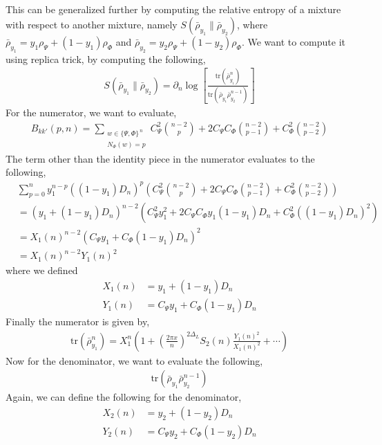 \documentclass[11pt]{article}
\newcommand{\p}{\partial}
\newcommand{\lb}{\left(}
\newcommand{\rb}{\right)}
\begin{document}
\subsection{}
This can be generalized further by computing the relative entropy of a mixture with respect to another mixture, namely $S(\bar{\rho}_{y_1} \| \bar{\rho}_{y_2} )$, where $\bar{\rho}_{y_1}=y_1\rho_\Psi+(1-y_1)\rho_\Phi$ and $\bar{\rho}_{y_2}=y_2\rho_\Psi+(1-y_2)\rho_\Phi$. 
We want to compute it using replica trick, by computing the following,
\begin{align}
    S(\bar{\rho}_{y_1} \| \bar{\rho}_{y_2} ) = \p_n \log \left[\frac{\text{tr}(\bar{\rho}_{y_1}^n)}{\text{tr}(\bar{\rho}_{y_1}\bar{\rho}_{y_2}^{n-1})}\right]
\end{align}
For the numerator, we want to evaluate,
\begin{align}
    B_{kk'}(p,n) = \sum_{\substack{w\in\{\Psi,\Phi\}^{\,n}\\ N_\Phi(w)=p}} C_\Psi^2 \binom{n-2}{p} + 2C_\Psi C_\Phi \binom{n-2}{p-1} +C_\Phi^2\binom{n-2}{p-2}
\end{align}
The term other than the identity piece in the numerator evaluates to the following,
\begin{align}
    & \sum_{p=0}^{n} y_1^{n-p} \lb (1-y_1)D_n\rb^p\lb C_\Psi^2 \binom{n-2}{p} + 2C_\Psi C_\Phi \binom{n-2}{p-1} +C_\Phi^2\binom{n-2}{p-2} \rb \\
    &= \lb y_1+ (1-y_1 )D_n\rb^{n-2} \lb C_\Psi^2 y_1^2 + 2C_\Psi C_\Phi y_1(1-y_1)D_n + C_\Phi^2 ((1-y_1)D_n)^2  \rb \\
    &= X_1(n)^{n-2} \lb C_\Psi y_1 + C_\Phi(1-y_1)D_n \rb^2 \\
    &= X_1(n)^{n-2}Y_1(n)^{2}
\end{align}
where we defined
\begin{align}
    X_1(n) &= y_1 + (1-y_1)D_n \\
    Y_1(n) &=  C_\Psi y_1 + C_\Phi(1-y_1)D_n 
\end{align}
Finally the numerator is given by,
\begin{align}
    \text{tr}(\bar{\rho}_{y_1}^n) = X_1^n\lb1 + \lb\frac{2\pi x}{n}\rb^{2\Delta_L} S_2(n) \frac{Y_1(n)^2}{X_1(n)^2} + \cdots \rb
\end{align}
Now for the denominator, we want to evaluate the following, 
\begin{align}
    \text{tr}\lb \bar{\rho}_{y_1}\bar{\rho}_{y_2}^{n-1}  \rb
\end{align}
Again, we can define the following for the denominator,
\begin{align}
    X_2(n) &= y_2 + (1-y_2)D_n \\
    Y_2(n) &=  C_\Psi y_2 + C_\Phi(1-y_2)D_n 
\end{align}
\end{document}
